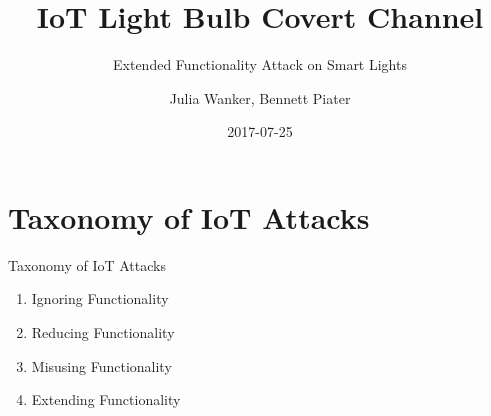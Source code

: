 \documentclass[11pt,t,usepdftitle=false,aspectratio=169]{beamer}
\title[IoT Light Bulb Attack]{IoT Light Bulb Covert Channel}
\subtitle{Extended Functionality Attack on Smart Lights}
\author[Julia Wanker \& Bennett Piater]{Julia Wanker, Bennett Piater}
\date{2017-07-25}
\begin{document}



\section{Taxonomy of IoT Attacks}
\begin{frame}{Taxonomy of IoT Attacks~\cite{Ronen:2016:EFAIDCSL}}
	\begin{enumerate}
		\item Ignoring Functionality
		\item Reducing Functionality
		\item Misusing Functionality
		\item Extending Functionality
	\end{enumerate}
\end{frame}
\end{document}
